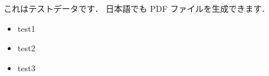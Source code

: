 これはテストデータです． 日本語でも PDF ファイルを生成できます．

\begin{itemize}
\tightlist
\item
  test1
\item
  test2
\item
  test3
\end{itemize}
